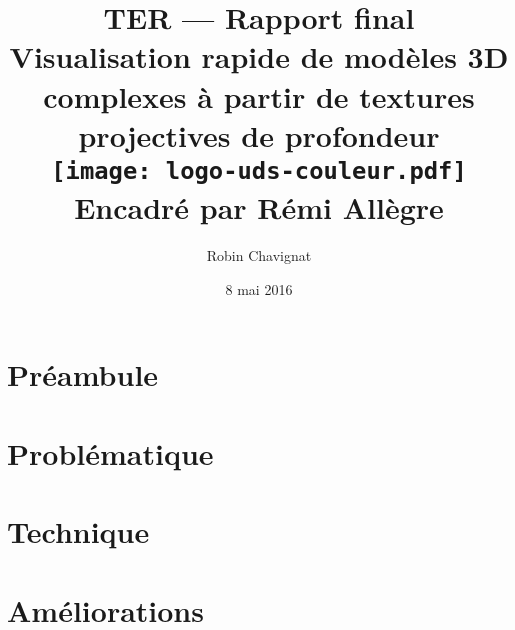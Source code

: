 \documentclass[12pt,twoside]{report}
\begin{document}
\title{
    {TER --- Rapport final}\\
    {Visualisation rapide de modèles 3D complexes à partir de textures projectives de profondeur}\\
    {\texttt{[image: logo-uds-couleur.pdf]}}\\ %
    {Encadré par Rémi Allègre}
}
\author{Robin Chavignat}
\date{8 mai 2016}
\maketitle
\renewcommand*\contentsname{Table des matières}
\tableofcontents

\chapter{Préambule}



\chapter{Problématique}



\chapter{Technique}



\chapter{Améliorations}





\end{document}
